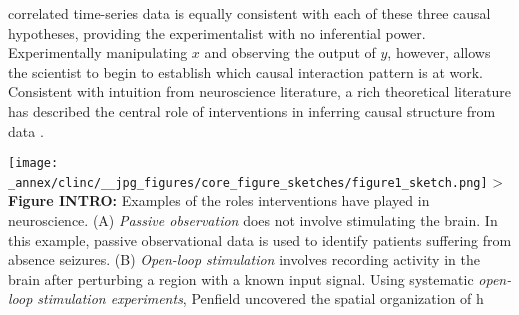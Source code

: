 correlated time-series data is equally consistent with each of these
three causal hypotheses, providing the experimentalist with no
inferential power. Experimentally manipulating \(x\) and observing the
output of \(y\), however, allows the scientist to begin to establish
which causal interaction pattern is at work. Consistent with intuition
from neuroscience literature, a rich theoretical literature has
described the central role of interventions in inferring causal
structure from data .

\texttt{[image: \_annex/clinc/\_\_jpg\_figures/core\_figure\_sketches/figure1\_sketch.png]}
\textgreater{} \textbf{Figure INTRO:} Examples of the roles
interventions have played in neuroscience. (A) \emph{Passive
observation} does not involve stimulating the brain. In this example,
passive observational data is used to identify patients suffering from
absence seizures. (B) \emph{Open-loop stimulation} involves recording
activity in the brain after perturbing a region with a known input
signal. Using systematic \emph{open-loop stimulation experiments},
Penfield uncovered the spatial organization of h
